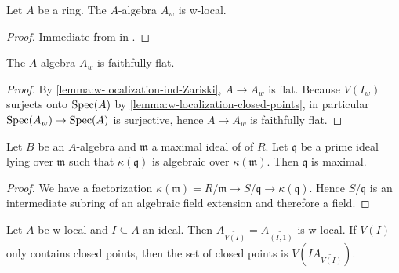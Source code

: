 \begin{corollary}
    Let $A$ be a ring. The $A$-algebra $A_w$ is w-local.
    \label{cor:w-localization-w-local}
    \leanok
\end{corollary}

\begin{proof}
  \leanok
  Immediate from  in .
\end{proof}

\begin{lemma}
    The $A$-algebra $A_w$ is faithfully flat.
    \label{lemma:w-localization-faithfully-flat}
    \leanok
\end{lemma}

\begin{proof}
    \leanok
    By \ref{lemma:w-localization-ind-Zariski}, $A \to A_w$ is flat. Because
    $V(I_w)$ surjects onto $\mathrm{Spec}(A)$ by \ref{lemma:w-localization-closed-points},
    in particular $\mathrm{Spec}(A_w) \to \mathrm{Spec}(A)$ is surjective, hence
    $A \to A_w$ is faithfully flat.
\end{proof}

\begin{lemma}[\stacksproject{00GA}]
    Let $B$ be an $A$-algebra and $\mathfrak{m}$ a maximal ideal of of $R$. Let
    $\mathfrak{q}$ be a prime ideal lying over $\mathfrak{m}$ such that
    $\kappa(\mathfrak{q})$ is algebraic over $\kappa(\mathfrak{m})$. Then
    $\mathfrak{q}$ is maximal.
    \label{lemma:prime-over-maximal-algebraic}
    \leanok
\end{lemma}

\begin{proof}
    \leanok
    We have a factorization $\kappa(\mathfrak{m}) = R / \mathfrak{m} \to S / \mathfrak{q} \to \kappa(\mathfrak{q})$.
    Hence $S / \mathfrak{q}$ is an intermediate subring of an algebraic field extension and therefore
    a field.
\end{proof}

\begin{lemma}
    Let $A$ be w-local and $I \subseteq A$ an ideal. Then
    $A_{\widetilde{V(I)}} = A_{\widetilde{(I,1)}}$ is w-local. If $V(I)$ only contains closed points, then
    the set of closed points is $V(IA_{\widetilde{V(I)}})$.
    \label{lemma:w-local-tilde-w-local}
    \leanok
\end{lemma}

